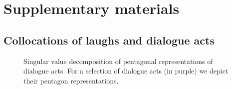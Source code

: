 \documentclass[11pt,a4paper]{article}
\begin{document}







\appendix
\onecolumn
\section{Supplementary materials}\label{sec:suppl}

\subsection{Collocations of laughs and dialogue acts}
\label{sec:app:da-svd}


\begin{figure}[h!]
  \centering
  \fontsize{6}{10}\selectfont
  \sffamily
  
  \caption{Singular value decomposition of pentagonal representations of dialogue acts. For a selection of dialogue acts (in purple) we depict their pentagon representations.}
    \label{fig:da-svd}
\end{figure}

\pagebreak
\end{document}
